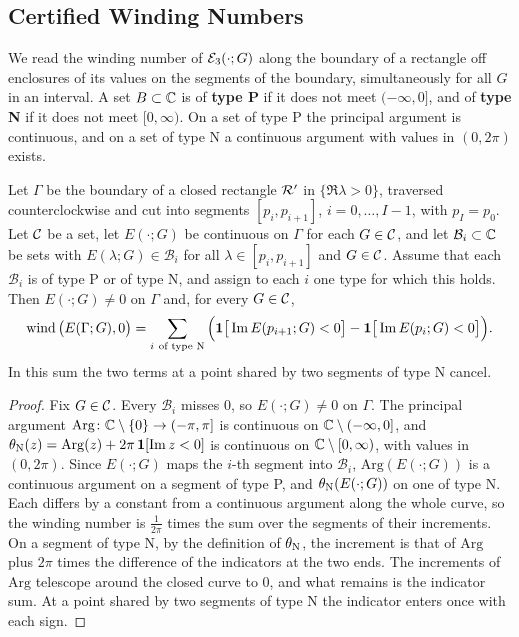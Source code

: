 \subsection{Certified Winding Numbers}

We read the winding number of $\mathcal{E}_3(\cdot;G)$ along the boundary of a rectangle
off enclosures of its values on the segments of the boundary, simultaneously for all
$G$ in an interval. A set $B\subset\mathbb{C}$ is of \textbf{type P} if it does not meet $(-\infty,0]$, and
of \textbf{type N} if it does not meet $[0,\infty)$. On a set of type P the principal
argument is continuous, and on a set of type N a continuous argument with values in
$(0,2\pi)$ exists.

\begin{proposition}
\label{prop:winding}
Let $\Gamma$ be the boundary of a closed rectangle $\mathcal{R}'$ in $\{\Re\lambda>0\}$,
traversed counterclockwise and cut into segments $[p_i,p_{i+1}]$,
$i=0,\dots,I-1$, with $p_I=p_0$. Let $\mathcal{C}$ be a set, let $E(\cdot;G)$ be continuous
on $\Gamma$ for each $G\in\mathcal{C}$, and let $\mathcal B_i\subset\mathbb{C}$ be sets with
$E(\lambda;G)\in\mathcal B_i$ for all $\lambda\in[p_i,p_{i+1}]$ and $G\in\mathcal{C}$. Assume that
each $\mathcal B_i$ is of type P or of type N, and assign to each $i$ one type for which this
holds. Then $E(\cdot;G)\ne0$ on $\Gamma$ and, for every $G\in\mathcal{C}$,
\[
\operatorname{wind}\big(E(\Gamma;G),0\big)=\sum_{i\ \text{of type N}}\Big(\mathbf 1\big[\Im E(p_{i+1};G)<0\big]-\mathbf 1\big[\Im E(p_i;G)<0\big]\Big).
\]
In this sum the two terms at a point shared by two segments of type N cancel.
\end{proposition}
\begin{proof}
Fix $G\in\mathcal{C}$. Every $\mathcal B_i$ misses $0$, so $E(\cdot;G)\ne0$ on $\Gamma$. The
principal argument $\mathrm{Arg}\colon\mathbb{C}\setminus\{0\}\to(-\pi,\pi]$ is continuous on
$\mathbb{C}\setminus(-\infty,0]$, and
$\theta_{\rm N}(z)=\mathrm{Arg}(z)+2\pi\,\mathbf 1[\Im z<0]$ is continuous on
$\mathbb{C}\setminus[0,\infty)$, with values in $(0,2\pi)$. Since $E(\cdot;G)$ maps the
$i$-th segment into $\mathcal B_i$, $\mathrm{Arg}(E(\cdot;G))$ is a continuous
argument on a segment of type P, and $\theta_{\rm N}(E(\cdot;G))$ on one of type N. Each differs by a constant from a continuous argument along the
whole curve, so the winding number is $\frac1{2\pi}$ times the sum over the
segments of their increments. On a segment of type N, by the definition of
$\theta_{\rm N}$, the increment is that of $\mathrm{Arg}$ plus $2\pi$ times the
difference of the indicators at the two ends. The increments of $\mathrm{Arg}$ telescope around the
closed curve to $0$, and what remains is the indicator sum. At a point shared by
two segments of type N the indicator enters once with each sign.
\end{proof}

